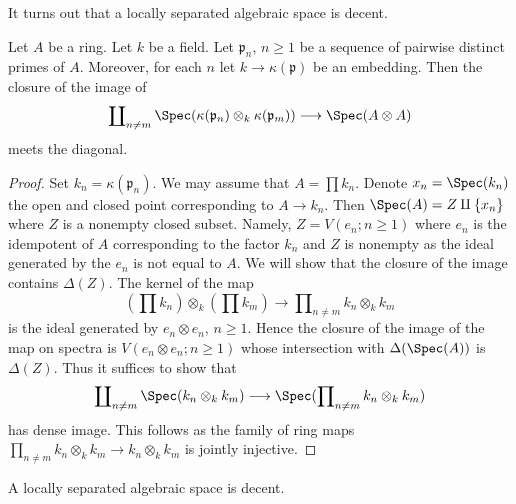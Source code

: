 \noindent
It turns out that a locally separated algebraic space is decent.

\begin{lemma}
\label{lemma-infinite-number}
Let $A$ be a ring. Let $k$ be a field. Let $\mathfrak p_n$, $n \geq 1$
be a sequence of pairwise distinct primes of $A$. Moreover, for each
$n$ let $k \to \kappa(\mathfrak p)$ be an embedding. Then the closure
of the image of
$$
\coprod\nolimits_{n \not = m}
\Spec(\kappa(\mathfrak p_n) \otimes_k \kappa(\mathfrak p_m))
\longrightarrow
\Spec(A \otimes A)
$$
meets the diagonal.
\end{lemma}

\begin{proof}
Set $k_n = \kappa(\mathfrak p_n)$. We may assume that $A = \prod k_n$.
Denote $x_n = \Spec(k_n)$ the open and closed point corresponding to
$A \to k_n$. Then $\Spec(A) = Z \amalg \{x_n\}$ where $Z$ is a nonempty
closed subset. Namely, $Z = V(e_n; n \geq 1)$ where $e_n$
is the idempotent of $A$ corresponding to the factor $k_n$
and $Z$ is nonempty as the ideal generated by the $e_n$ is not
equal to $A$. We will show that the closure of the image
contains $\Delta(Z)$. The kernel of the map
$$
(\prod k_n) \otimes_k (\prod k_m)
\longrightarrow
\prod\nolimits_{n \not = m} k_n \otimes_k k_m
$$
is the ideal generated by $e_n \otimes e_n$, $n \geq 1$.
Hence the closure of the image of the map on spectra is 
$V(e_n \otimes e_n; n \geq 1)$ whose intersection with $\Delta(\Spec(A))$
is $\Delta(Z)$. Thus it suffices to show that
$$
\coprod\nolimits_{n \not = m} \Spec(k_n \otimes_k k_m)
\longrightarrow
\Spec(\prod\nolimits_{n \not = m} k_n \otimes_k k_m)
$$
has dense image. This follows as the family of ring maps
$\prod_{n \not = m} k_n \otimes_k k_m \to k_n \otimes_k k_m$
is jointly injective.
\end{proof}

\begin{lemma}
\label{lemma-locally-separated-decent}
A locally separated algebraic space is decent.
\end{lemma}

